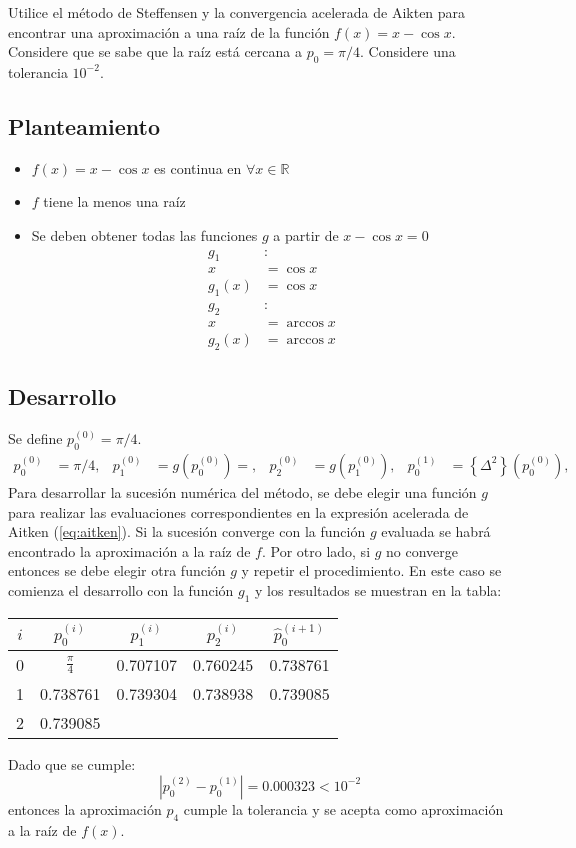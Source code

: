 \begin{exerciseT}
Utilice el método de Steffensen y la convergencia acelerada de Aikten para encontrar una aproximación a una raíz 
de la función $f(x) = x-\cos x$. Considere que se sabe que la raíz está cercana a $p_0=\pi/4$. Considere una 
tolerancia $10^{-2}$.
\subsection*{Planteamiento}
\begin{itemize}
	\item $f(x) = x-\cos x$ es continua en $\forall x\in\mathbb{R}$
	\item $f$ tiene la menos una raíz
	\item Se deben obtener todas las funciones $g$ a partir de $x-\cos x=0$
		\begin{align*}
			g_1&: \\
				x &= \cos x\\
				g_1(x) &= \cos x \\
			g_2&: \\
				x &= \arccos x\\
				g_2(x) &= \arccos x 
		\end{align*}
\end{itemize}

\subsection*{Desarrollo}
Se define $p_0^{(0)} = \pi/4$. 
\begin{align*}
	p_0^{(0)}&= \pi/4, & p_1^{(0)}&=g\left(p_0^{(0)}\right)=, & p_2^{(0)}&=g\left(p_1^{(0)}\right), & 
	p_0^{(1)}&=\left\lbrace \Delta^2\right\rbrace \left(p_0^{(0)}\right), 
\end{align*}
Para desarrollar la sucesión numérica del método, se debe elegir una función $g$ para realizar las evaluaciones
correspondientes en la expresión acelerada de Aitken (\ref{eq:aitken}). Si la sucesión converge con 
la función $g$ evaluada se habrá encontrado la aproximación a la raíz de $f$. Por otro lado, si $g$ no converge
entonces se debe elegir otra función $g$ y repetir el procedimiento. En este caso se comienza el desarrollo con 
la función $g_1$ y los resultados se muestran en la tabla: 
\begin{table}[H]
	\centering
	\begin{tabular}{c|c|c|c|c}
	$i$ & $p_0^{(i)}$ & $p_1^{(i)}$ & $p_2^{(i)}$ & $\hat{p}_0^{(i+1)}$ \\\midrule
	0 & $\frac{\pi}{4}$ & 0.707107 & 0.760245 & 0.738761 \\
	1 & 0.738761 & 0.739304 & 0.738938 & 0.739085\\
	2 & 0.739085 & & &
	\end{tabular}
\end{table}
Dado que se cumple: 
\[\left|p_0^{(2)}-p_0^{(1)} \right| = 0.000323 	< 10^{-2}  \]
entonces la aproximación $p_4$ cumple la tolerancia y se acepta como aproximación a la raíz de $f(x)$.


\end{exerciseT}
